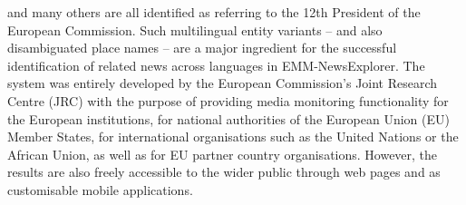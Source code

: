 \documentclass[output=paper]{langsci/langscibook}
\begin{document}
and\ili{} many\ili{} others\ili{} are\ili{} all\ili{} identified\ili{} as\ili{} referring\ili{} to\ili{} the\ili{} 12th\ili{} President\ili{} of\ili{} the\ili{} European\ili{} Commission\ili{}.\ili{} Such\ili{} multilingual\ili{} entity\ili{} variants\ili{} \ili{}–\ili{} and\ili{} also\ili{} disambiguated\ili{} place\ili{} names\ili{} \ili{}–\ili{} are\ili{} a\ili{} major\ili{} ingredient\ili{} for\ili{} the\ili{} successful\ili{} identification\ili{} of\ili{} related\ili{} news\ili{} across\ili{} languages\ili{} in\ili{} EMM\ili{}-NewsExplorer\ili{}.\ili{} The\ili{} system\ili{} was\ili{} entirely\ili{} developed\ili{} by\ili{} the\ili{} European\ili{} Commission\ili{}’s\ili{} Joint\ili{} Research\ili{} Centre\ili{} \ili{}(JRC\ili{})\ili{} with\ili{} the\ili{} purpose\ili{} of\ili{} providing\ili{} media\ili{} monitoring\ili{} functionality\ili{} for\ili{} the\ili{} European\ili{} institutions\ili{},\ili{} for\ili{} national\ili{} authorities\ili{} of\ili{} the\ili{} European\ili{} Union\ili{} \ili{}(EU\ili{})\ili{} Member\ili{} States\ili{},\ili{} for\ili{} international\ili{} organisations\ili{} such\ili{} as\ili{} the\ili{} United\ili{} Nations\ili{} or\ili{} the\ili{} African\ili{} Union\ili{},\ili{} as\ili{} well\ili{} as\ili{} for\ili{} EU\ili{} partner\ili{} country\ili{} organisations\ili{}.\ili{} However\ili{},\ili{} the\ili{} results\ili{} are\ili{} also\ili{} freely\ili{} accessible\ili{} to\ili{} the\ili{} wider\ili{} public\ili{} through\ili{} web\ili{} pages\ili{} and\ili{} as\ili{} customisable\ili{} mobile\ili{} applications\ili{}.\ili{}
\ili{}
\ili{} \ili{}
\ili{}%
\end{document}
